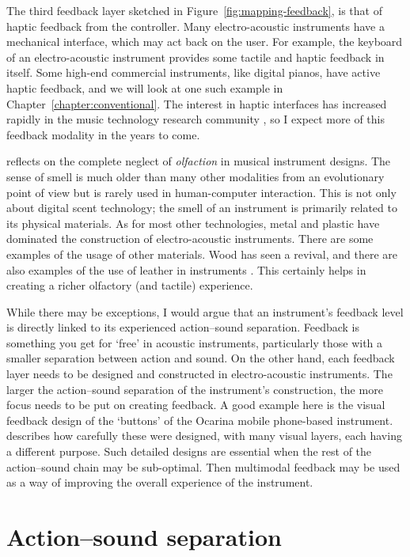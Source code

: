 The third feedback layer sketched in Figure~\ref{fig:mapping-feedback}, is that of haptic feedback from the controller. Many electro-acoustic instruments have a mechanical interface, which may act back on the user. For example, the keyboard of an electro-acoustic instrument provides some tactile and haptic feedback in itself. Some high-end commercial instruments, like digital pianos, have active haptic feedback, and we will look at one such example in Chapter~\ref{chapter:conventional}. The interest in haptic interfaces has increased rapidly in the music technology research community \citep{papetti_musical_2018}, so I expect more of this feedback modality in the years to come.

\citet{braasch_telematic_2009} reflects on the complete neglect of \emph{olfaction} in musical instrument designs. The sense of smell is much older than many other modalities from an evolutionary point of view but is rarely used in human-computer interaction. This is not only about digital scent technology; the smell of an instrument is primarily related to its physical materials. As for most other technologies, metal and plastic have dominated the construction of electro-acoustic instruments. There are some examples of the usage of other materials. Wood has seen a revival, and there are also examples of the use of leather in instruments \citep{favilla_bent_2005}. This certainly helps in creating a richer olfactory (and tactile) experience.

While there may be exceptions, I would argue that an instrument's feedback level is directly linked to its experienced action--sound separation. Feedback is something you get for `free' in acoustic instruments, particularly those with a smaller separation between action and sound. On the other hand, each feedback layer needs to be designed and constructed in electro-acoustic instruments. The larger the action--sound separation of the instrument's construction, the more focus needs to be put on creating feedback. A good example here is the visual feedback design of the `buttons' of the Ocarina mobile phone-based instrument. \citet{wang_artful_2018} describes how carefully these were designed, with many visual layers, each having a different purpose. Such detailed designs are essential when the rest of the action--sound chain may be sub-optimal. Then multimodal feedback may be used as a way of improving the overall experience of the instrument.


\section{Action--sound separation}

